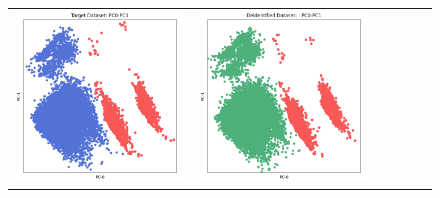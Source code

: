 \begin{figure}[p!]
\begin{tabular}{@{} M{0.166\textwidth} M{0.166\textwidth} | M{0.166\textwidth} M{0.166\textwidth} | M{0.166\textwidth} M{0.166\textwidth} @{}}
       \includegraphics[width=\linewidth]{z_CART.orig.png} &
       \includegraphics[width=\linewidth]{z_CART.syn.png} &

\end{tabular}
\end{figure}
